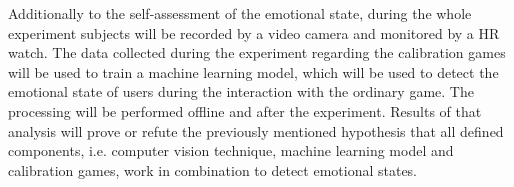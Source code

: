 Additionally to the self-assessment of the emotional state, during the whole experiment subjects will be recorded by a video camera and monitored by a HR watch. The data collected during the experiment regarding the calibration games will be used to train a machine learning model, which will be used to detect the emotional state of users during the interaction with the ordinary game. The processing will be performed offline and after the experiment. Results of that analysis will prove or refute the previously mentioned hypothesis that all defined components, i.e. computer vision technique, machine learning model and calibration games, work in combination to detect emotional states.




